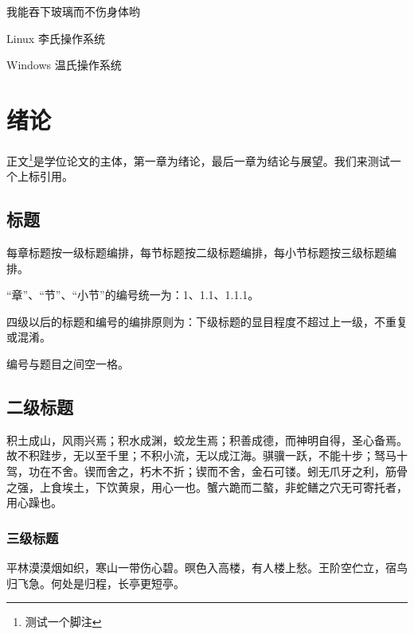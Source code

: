\documentclass[
    bachelor, 
    ]{xjtuthesis}
\begin{document}
    \clearpage

    \xjtucontent

    \begin{denotation}

      \item[\xjtuthesis]    我能吞下玻璃而不伤身体哟
      \item[Linux]          李氏操作系统
      \item[Windows]        温氏操作系统

    \end{denotation}


    \chapter{绪论}

        正文\footnote{测试一个脚注}是学位论文的主体，第一章为绪论，最后一章为结论与展望。我们来测试一个上标引用\cite{niubi-paper}。
        
        \section{标题}

        每章标题按一级标题编排，每节标题按二级标题编排，每小节标题按三级标题编排。

        “章”、“节”、“小节”的编号统一为：1、1.1、1.1.1。

        四级以后的标题和编号的编排原则为：下级标题的显目程度不超过上一级，不重复或混淆。

        编号与题目之间空一格。


        \section{二级标题}


            积土成山，风雨兴焉；积水成渊，蛟龙生焉；积善成德，而神明自得，圣心备焉。故不积跬步，无以至千里；不积小流，无以成江海。骐骥一跃，不能十步；驽马十驾，功在不舍。锲而舍之，朽木不折；锲而不舍，金石可镂。蚓无爪牙之利，筋骨之强，上食埃土，下饮黄泉，用心一也。蟹六跪而二螯，非蛇鳝之穴无可寄托者，用心躁也。 

            \subsection{三级标题}

            平林漠漠烟如织，寒山一带伤心碧。暝色入高楼，有人楼上愁。王阶空伫立，宿鸟归飞急。何处是归程，长亭更短亭。
\end{document}
